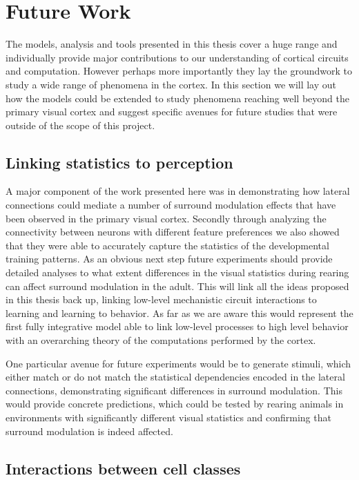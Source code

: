 \section{Future Work}

The models, analysis and tools presented in this thesis cover a huge
range and individually provide major contributions to our
understanding of cortical circuits and computation. However perhaps
more importantly they lay the groundwork to study a wide range of
phenomena in the cortex. In this section we will lay out how the
models could be extended to study phenomena reaching well beyond the
primary visual cortex and suggest specific avenues for future studies
that were outside of the scope of this project.

\subsection{Linking statistics to perception}

A major component of the work presented here was in demonstrating how
lateral connections could mediate a number of surround modulation
effects that have been observed in the primary visual cortex. Secondly
through analyzing the connectivity between neurons with different
feature preferences we also showed that they were able to accurately
capture the statistics of the developmental training patterns. As an
obvious next step future experiments should provide detailed analyses
to what extent differences in the visual statistics during rearing can
affect surround modulation in the adult. This will link all the ideas
proposed in this thesis back up, linking low-level mechanistic circuit
interactions to learning and learning to behavior. As far as we are
aware this would represent the first fully integrative model able to
link low-level processes to high level behavior with an overarching
theory of the computations performed by the cortex.

One particular avenue for future experiments would be to generate
stimuli, which either match or do not match the statistical
dependencies encoded in the lateral connections, demonstrating
significant differences in surround modulation. This would provide
concrete predictions, which could be tested by rearing animals in
environments with significantly different visual statistics and
confirming that surround modulation is indeed affected.

\subsection{Interactions between cell classes}

